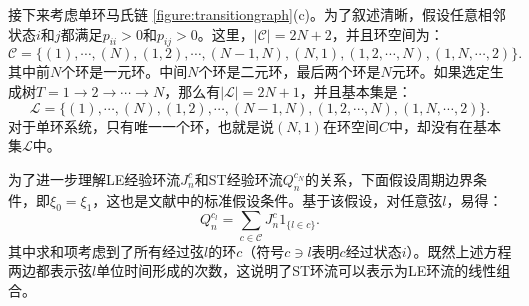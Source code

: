 接下来考虑单环马氏链 \ref{figure:transitiongraph}(c)。为了叙述清晰，假设任意相邻状态$i$和$j$都满足$p_{ii}>0$和$p_{ij}>0$。这里，$|\mathcal{C}| = 2N +2$，并且环空间为：
\begin{equation}\label{cycle_space}
    \mathcal{C} = \{(1),\cdots,(N),(1,2),\cdots,(N-1,N),(N,1),(1,2,\cdots,N),(1,N,\cdots,2)\}.
\end{equation}
其中前$N$个环是一元环。中间$N$个环是二元环，最后两个环是$N$元环。如果选定生成树$T = 1\to 2\to\cdots \to N$，那么有$|\mathcal{L}| = 2N + 1$，并且基本集是：
\begin{equation*}
    \mathcal{L} = \{(1),\cdots,(N),(1,2),\cdots,(N-1,N),(1,2,\cdots,N),(1,N,\cdots,2)\}.
\end{equation*}
对于单环系统，只有唯一一个环，也就是说$(N, 1)$在环空间$C$中，却没有在基本集$\mathcal{L}$中。

为了进一步理解LE经验环流$J_n^c$和ST经验环流$Q_n^{c_N}$的关系，下面假设周期边界条件，即$\xi_0 = \xi_1$，这也是文献\cite{den2000large}中的标准假设条件。基于该假设，对任意弦$l$，易得：
\begin{equation}\label{conversion}
    Q_n^{c_l} = \sum_{c\in\mathcal{C}}J^c_n1_{\{l\in c\}}.
\end{equation}
其中求和项考虑到了所有经过弦$l$的环$c$（符号$c \ni l$表明$c$经过状态$i$）。既然上述方程两边都表示弦$l$单位时间形成的次数，这说明了ST环流可以表示为LE环流的线性组合。
